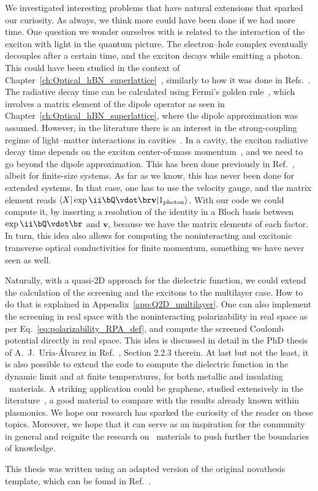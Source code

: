 We investigated interesting problems that have natural extensions that sparked our curiosity.
As always, we think more could have been done if we had more time.
One question we wonder ourselves with is related to the interaction of the exciton with light in the quantum picture.
The electron--hole complex eventually decouples after a certain time, and the exciton decays while emitting a photon.
This could have been studied in the context of Chapter~\ref{ch:Optical_hBN_superlattice}~\cite{Ninhos_Tserkezis_Mortensen_Peres_2024}, similarly to how it was done in Refs.~\cite{Ventura_2019,PhysRevB.111.075411}.
The radiative decay time can be calculated using Fermi's golden rule~\cite{Griffiths_2023,Sakurai,Zettili_2009}, which involves a matrix element of the dipole operator as seen in Chapter~\ref{ch:Optical_hBN_superlattice}, where the dipole approximation was assumed.
However, in the literature there is an interest in the strong-coupling regime of light--matter interactions in cavities~\cite{cavity_2023,cavity_2024}.
In a cavity, the exciton radiative decay time depends on the exciton center-of-mass momentum~\cite{PhysRevB.111.075411}, and we need to go beyond the dipole approximation.
This has been done previously in Ref.~\cite{PhysRevB.86.085304}, albeit for finite-size systems.
As far as we know, this has never been done for extended systems.
In that case, one has to use the velocity gauge, and the matrix element reads $\langle X |\exp{\ii \bQ \vdot \br} \mathbf{v}|1_{\mathrm{photon}} \rangle$.
With our code we could compute it, by inserting a resolution of the identity in a Bloch basis between $\exp{\ii \bQ \vdot \br}$ and $\mathbf{v}$, because we have the matrix elements of each factor.
In turn, this idea also allows for computing the noninteracting and excitonic transverse optical conductivities for finite momentum, something we have never seen as well.

Naturally, with a quasi-2D approach for the dielectric function, we could extend the calculation of the screening and the excitons to the multilayer case.
How to do that is explained in Appendix~\ref{app:Q2D_multilayer}.
One can also implement the screening in real space with the noninteracting polarizability in real space as per Eq.~\eqref{eq:polarizability_RPA_def}, and compute the screened Coulomb potential directly in real space.
This idea is discussed in detail in the PhD thesis of A.~J.~Ur\'ia-\'Alvarez in Ref.~\cite{Alex_PhD}, Section 2.2.3 therein.
At last but not the least, it is also possible to extend the code to compute the dielectric function in the dynamic limit and at finite temperatures, for both metallic and insulating \bd~materials.
A striking application could be graphene, studied extensively in the literature~\cite{Andre_Goncalves_2020,GoncalvesPeres:2016,Cosme_2025}, a good material to compare with the results already known within plasmonics.
We hope our research has sparked the curiosity of the reader on these topics.
Moreover, we hope that it can serve as an inspiration for the community in general and reignite the research on \bd~materials to push further the boundaries of knowledge.

This thesis was written using an adapted version of the original novathesis template, which can be found in Ref.~\cite{novathesis-manual}.